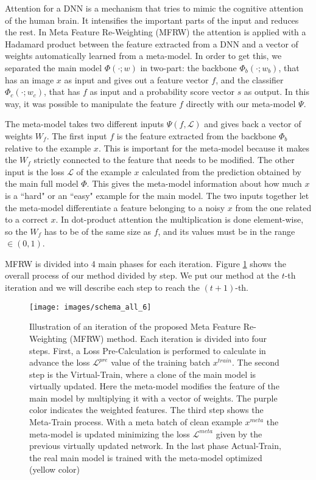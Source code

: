 \documentclass[runningheads]{llncs}
\begin{document}
	Attention for a DNN is a mechanism that tries to mimic the cognitive attention of the human brain. It intensifies the important parts of the input and reduces the rest. In Meta Feature Re-Weighting (MFRW) the attention is applied with a Hadamard product between the feature extracted from a DNN and a vector of weights automatically learned from a meta-model. In order to get this, we separated the main model $\Phi(\cdot; w)$ in two-part: the backbone $\Phi_b(\cdot; w_b)$, that has an image $x$ as input and gives out a feature vector $f$, and the classifier $\Phi_c(\cdot; w_c)$, that has $f$ as input and a probability score vector $s$ as output. In this way, it was possible to manipulate the feature $f$ directly with our meta-model $\Psi$.
	
	The meta-model takes two different inputs $\Psi(f,\mathcal{L})$ and gives back a vector of weights $W_f$. The first input $f$ is the feature extracted from the backbone $\Phi_b$ relative to the example $x$. This is important for the meta-model because it makes the $W_f$ strictly connected to the feature that needs to be modified. The other input is the loss $\mathcal{L}$ of the example $x$ calculated from the prediction obtained by the main full model $\Phi$. This gives the meta-model information about how much $x$ is a ``hard" or an ``easy" example for the main model. The two inputs together let the meta-model differentiate a feature belonging to a noisy $x$ from the one related to a correct $x$. In dot-product attention the multiplication is done element-wise, so the $W_f$ has to be of the same size as $f$, and its values must be in the range $\in (0,1)$.
	
	MFRW is divided into 4 main phases for each iteration. Figure \ref{fig:schema1} shows the overall process of our method divided by step. We put our method at the $t$-th iteration and we will describe each step to reach the $(t+1)$-th.
	
	\begin{figure}
		\centering
		\texttt{[image: images/schema\_all\_6]}
		\caption{Illustration of an iteration of the proposed Meta Feature Re-Weighting (MFRW) method. Each iteration is divided into four steps. First, a Loss Pre-Calculation is performed to calculate in advance the loss $\mathcal{L}^{pre}$ value of the training batch $x^{train}$. The second step is the Virtual-Train, where a clone of the main model is virtually updated. Here the meta-model modifies the feature of the main model by multiplying it with a vector of weights. The purple color indicates the weighted features. The third step shows the Meta-Train process. With a meta batch of clean example $x^{meta}$ the meta-model is updated minimizing the loss $\mathcal{L}^{meta}$ given by the previous virtually updated network. In the last phase Actual-Train, the real main model is trained with the meta-model optimized (yellow color)}
		\label{fig:schema1}
	\end{figure}
	
\end{document}
